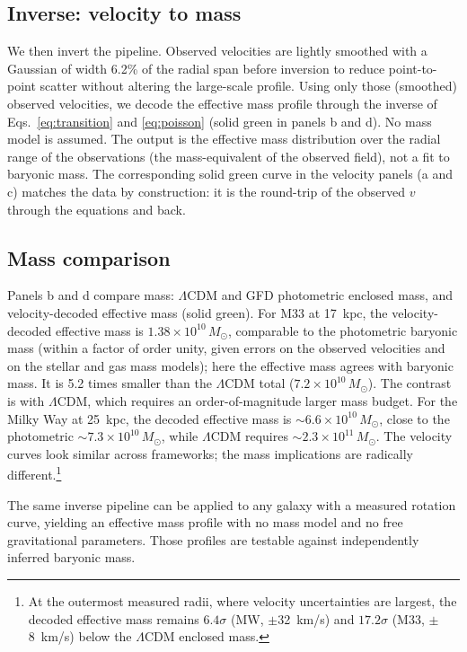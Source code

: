\documentclass[fleqn,usenatbib]{mnras}
\begin{document}
\subsection{Inverse: velocity to mass}
We then invert the pipeline. Observed velocities are lightly smoothed with a Gaussian of width 6.2\% of the radial span before inversion to reduce point-to-point scatter without altering the large-scale profile. Using only those (smoothed) observed velocities, we decode the effective mass profile through the inverse of Eqs.~\ref{eq:transition} and \ref{eq:poisson} (solid green in panels b and d). No mass model is assumed. The output is the effective mass distribution over the radial range of the observations (the mass-equivalent of the observed field), not a fit to baryonic mass. The corresponding solid green curve in the velocity panels (a and c) matches the data by construction: it is the round-trip of the observed $v$ through the equations and back.

\subsection{Mass comparison}
Panels b and d compare mass: $\Lambda$CDM and GFD photometric enclosed mass, and velocity-decoded effective mass (solid green). For M33 at 17~kpc, the velocity-decoded effective mass is $1.38\times10^{10}\,M_\odot$, comparable to the photometric baryonic mass (within a factor of order unity, given errors on the observed velocities and on the stellar and gas mass models); here the effective mass agrees with baryonic mass. It is 5.2 times smaller than the $\Lambda$CDM total ($7.2\times10^{10}\,M_\odot$). The contrast is with $\Lambda$CDM, which requires an order-of-magnitude larger mass budget. For the Milky Way at 25~kpc, the decoded effective mass is $\sim 6.6\times10^{10}\,M_\odot$, close to the photometric $\sim 7.3\times10^{10}\,M_\odot$, while $\Lambda$CDM requires $\sim 2.3\times10^{11}\,M_\odot$. The velocity curves look similar across frameworks; the mass implications are radically different.\footnote{At the outermost measured radii, where velocity uncertainties are largest, the decoded effective mass remains $6.4\sigma$ (MW, $\pm$32~km/s) and $17.2\sigma$ (M33, $\pm$8~km/s) below the $\Lambda$CDM enclosed mass.}

The same inverse pipeline can be applied to any galaxy with a measured rotation curve, yielding an effective mass profile with no mass model and no free gravitational parameters. Those profiles are testable against independently inferred baryonic mass.
\end{document}
